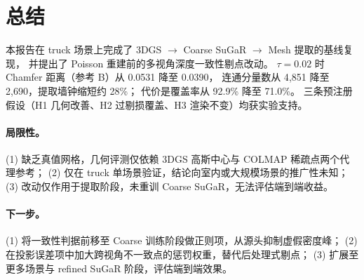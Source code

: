 \section{总结}

本报告在 truck 场景上完成了 3DGS $\to$ Coarse SuGaR $\to$ Mesh 提取的基线复现，
并提出了 Poisson 重建前的多视角深度一致性剔点改动。
$\tau{=}0.02$ 时 Chamfer 距离（参考 B）从 0.0531 降至 0.0390，
连通分量数从 4{,}851 降至 2{,}690，提取墙钟缩短约 28\%；
代价是覆盖率从 92.9\% 降至 71.0\%。
三条预注册假设（H1 几何改善、H2 过剔损覆盖、H3 渲染不变）均获实验支持。

\paragraph{局限性。}
(1) 缺乏真值网格，几何评测仅依赖 3DGS 高斯中心与 COLMAP 稀疏点两个代理参考；
(2) 仅在 truck 单场景验证，结论向室内或大规模场景的推广性未知；
(3) 改动仅作用于提取阶段，未重训 Coarse SuGaR，无法评估端到端收益。

\paragraph{下一步。}
(1) 将一致性判据前移至 Coarse 训练阶段做正则项，从源头抑制虚假密度峰；
(2) 在投影误差项中加大跨视角不一致点的惩罚权重，替代后处理式剔点；
(3) 扩展至更多场景与 refined SuGaR 阶段，评估端到端效果。
